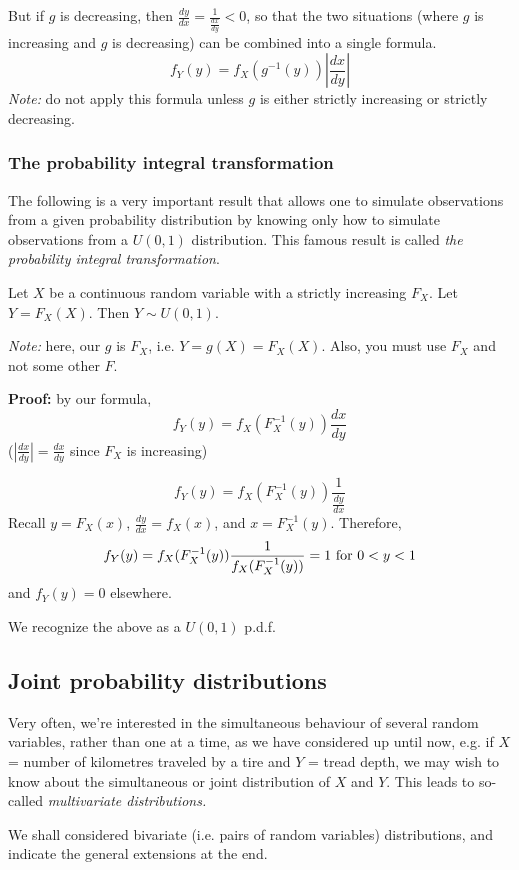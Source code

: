 \documentclass[12pt]{article}
\begin{document}
But if $g$ is decreasing, then $\frac{dy}{dx} = \frac{1}{\frac{dx}{dy}} < 0$, so that the two situations (where $g$ is increasing and $g$ is decreasing) can be combined into a single formula.
\[
    f_Y (y) = f_X (g^{-1} (y)) |\frac{dx}{dy}|
\]
\emph{Note:} do not apply this formula unless $g$ is either strictly increasing or strictly decreasing.

\subsubsection{The probability integral transformation}
The following is a very important result that allows one to simulate observations from a given probability distribution by knowing only how to simulate observations from a $U(0,1)$ distribution. This famous result is called \emph{the probability integral transformation}.

Let $X$ be a continuous random variable with a strictly increasing $F_X$. Let $Y = F_X (X)$. Then $Y \sim U(0,1)$.

\emph{Note:} here, our $g$ is $F_X$, i.e. $Y = g(X) = F_X (X)$. Also, you must use $F_X$ and not some other $F$.

\textbf{Proof:} by our formula, 
\[
    f_Y (y) = f_X (F_X^{-1} (y)) \frac{dx}{dy} 
\]
($|\frac{dx}{dy}| = \frac{dx}{dy}$ since $F_X$ is increasing)

\[
    f_Y (y) = f_X (F_X^{-1}(y)) \frac{1}{\frac{dy}{dx}}
\]
Recall $y = F_X (x)$, $\frac{dy}{dx} = f_X (x)$, and $x=F_X^{-1} (y)$. Therefore,
\[
    f_Y (y) = f_X (F_X^{-1} (y)) \frac{1}{f_X (F_X^{-1} (y))} = 1 \textnormal{ for } 0 < y < 1
\]
and $f_Y (y) = 0$ elsewhere.

We recognize the above as a $U(0,1)$ p.d.f.

\subsection{Joint probability distributions}
Very often, we're interested in the simultaneous behaviour of several random variables, rather than one at a time, as we have considered up until now, e.g. if $X$ = number of kilometres traveled by a tire and $Y$ = tread depth, we may wish to know about the simultaneous or joint distribution of $X$ and $Y$. This leads to so-called \emph{multivariate distributions.}

We shall considered bivariate (i.e. pairs of random variables) distributions, and indicate the general extensions at the end. 
\end{document}
